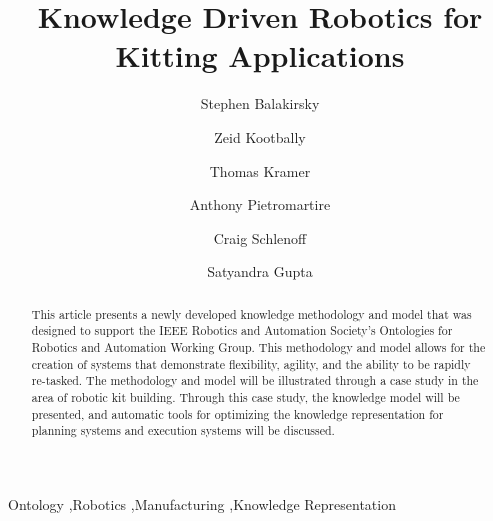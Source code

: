 \documentclass[preprint,12pt]{elsarticle}
\begin{document}
\begin{frontmatter}



\title{Knowledge Driven Robotics for Kitting Applications}


\author[NIST]{Stephen Balakirsky}
\author[NIST,UMD]{Zeid Kootbally}
\author[CATHU,NIST]{Thomas Kramer}
\author[NIST]{Anthony Pietromartire}
\author[NIST]{Craig Schlenoff}
\author[UMD]{Satyandra Gupta}

\address[CATHU]{Catholic University of America, Washington, DC, USA}
\address[NIST]{National Institute of Standards and Technology, Gaithersburg, MD USA}
\address[UMD]{University of Maryland, College Park, MD, USA}

\begin{abstract}
This article presents a newly developed knowledge methodology and model that was designed to support 
the IEEE Robotics and Automation Society's Ontologies for Robotics and Automation Working Group. 
This methodology and model allows for the creation of systems that 
demonstrate flexibility, agility, and the ability to be rapidly re-tasked. 
The methodology and model will be illustrated through a case study in the area of robotic kit building.
Through this case study, the knowledge model will be presented, and automatic
tools for optimizing the knowledge representation for planning systems and execution
systems will be discussed.
\end{abstract}

\begin{keyword}
Ontology \sep Robotics \sep Manufacturing \sep Knowledge Representation


\end{keyword}

\end{frontmatter}
\end{document}
